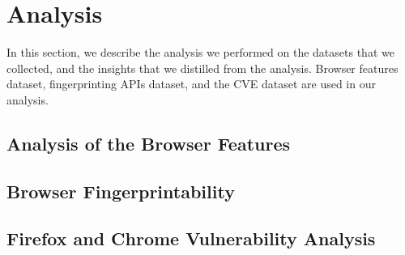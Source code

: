 \section{Analysis}
\label{sec:analysis}

In this section, we describe the analysis we performed on the datasets
that we collected, and the insights that we distilled from the
analysis. Browser features dataset, fingerprinting APIs dataset,
and the CVE dataset are used in our analysis.

\subsection{Analysis of the Browser Features}



\subsection{Browser Fingerprintability}



\subsection{Firefox and Chrome Vulnerability Analysis}

